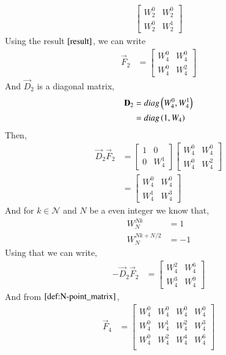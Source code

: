 \documentclass[journal,12pt,twocolumn]{IEEEtran}
\renewcommand\thesection{\arabic{section}}
\begin{document}
\begin{enumerate}[label=\arabic*.,ref=\thesection.\theenumi]
\begin{align}
\begin{bmatrix}
			W_2^{0} & W_2^{0} \\
			W_2^{0} & W_2^{1}
		\end{bmatrix}
	\end{align}
	Using the result $\eqref{result}$, we can write
	\begin{align}
		\vec{F}_{2} &= 
		\begin{bmatrix}
			W_4^{0} & W_4^{0} \\
			W_4^{0} & W_4^{2}
		\end{bmatrix} 
	\end{align}
	And $\vec{D}_{2}$ is a diagonal matrix,
	\begin{align}
		\mathbf{D}_{2} &= diag\left(W_4^0,W_4^1\right) \\
		&= diag\left(1,W_4\right)
	\end{align}
	Then,
	\begin{align}
		\vec{D}_2\vec{F}_2 &=\begin{bmatrix}
			1 & 0 \\
			0 & W_4^{1}
		\end{bmatrix}  
		\begin{bmatrix}
			W_4^{0} & W_4^{0} \\
			W_4^{0} & W_4^{2}
		\end{bmatrix} \\
		&= \begin{bmatrix}
			W_4^{0} & W_4^{0} \\
			W_4^{1} & W_4^{3}
		\end{bmatrix}
	\end{align}
	And for $k \in \mathcal{N}$ and $N$ be a even integer we know that,
	\begin{align}
		W_{N}^{Nk} &= 1 \label{fft-1}\\
		W_{N}^{Nk + N/2} &= -1 \label{fft-2}
	\end{align}
	Using that we can write,
	\begin{align}
		-\vec{D}_2\vec{F}_2 &= \begin{bmatrix}
			W_4^{2} & W_4^{6} \\
			W_4^{3} & W_4^{9}
		\end{bmatrix}
	\end{align}
	And from $\eqref{def:N-point_matrix}$,
	\begin{align}
		\vec{F}_{4} &= \begin{bmatrix}
			W_4^0 &  W_4^0& W_4^0 & W_4^0  \\
			W_4^0 & W_4^1 & W_4^2 & W_4^3  \\
			W_4^0 & W_4^2 & W_4^4 &  W_4^6 \\

\end{bmatrix}
\end{align}
\end{enumerate}
\end{document}
